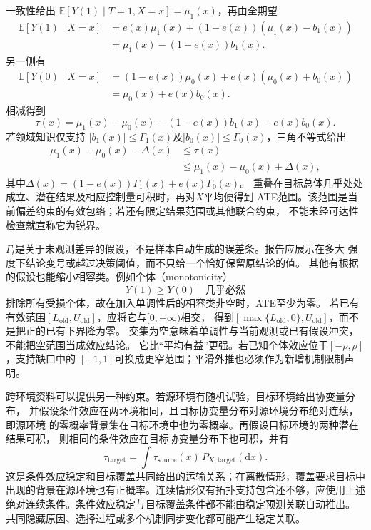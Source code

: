 一致性给出
\(\mathbb E[Y(1)\mid T=1,X=x]=\mu_1(x)\)，再由全期望
\[
  \begin{aligned}
    \mathbb E[Y(1)\mid X=x]
    &=e(x)\mu_1(x)+(1-e(x))(\mu_1(x)-b_1(x))\\
    &=\mu_1(x)-(1-e(x))b_1(x).
  \end{aligned}
\]
另一侧有
\[
  \begin{aligned}
    \mathbb E[Y(0)\mid X=x]
    &=(1-e(x))\mu_0(x)+e(x)(\mu_0(x)+b_0(x))\\
    &=\mu_0(x)+e(x)b_0(x).
  \end{aligned}
\]
相减得到
\begin{equation}
  \tau(x)=\mu_1(x)-\mu_0(x)
  -(1-e(x))b_1(x)-e(x)b_0(x).
  \label{eq:causal-selection-bias-function}
\end{equation}
若领域知识仅支持
\(|b_1(x)|\leq\Gamma_1(x)\)及\(|b_0(x)|\leq\Gamma_0(x)\)，三角不等式给出
\begin{equation}
  \begin{aligned}
    \mu_1(x)-\mu_0(x)-\Delta(x)
    &\leq\tau(x)\\
    &\leq\mu_1(x)-\mu_0(x)+\Delta(x),
  \end{aligned}
  \label{eq:causal-sensitivity-bounds}
\end{equation}
其中\(\Delta(x)=(1-e(x))\Gamma_1(x)+e(x)\Gamma_0(x)\)。
重叠在目标总体几乎处处成立、潜在结果及相应控制量可积时，再对\(X\)平均便得到
ATE范围。该范围是当前偏差约束的有效包络；若还有限定结果范围或其他联合约束，
不能未经可达性检查就宣称它为锐界。

\(\Gamma_t\)是关于未观测差异的假设，不是样本自动生成的误差条。报告应展示在多大
强度下结论变号或越过决策阈值，而不只给一个恰好保留原结论的值。
其他有根据的假设也能缩小相容类。例如个体（monotonicity）
\[
  Y(1)\geq Y(0)\quad\text{几乎必然}
\]
排除所有受损个体，故在加入单调性后的相容类非空时，ATE至少为零。
若已有有效范围\([L_{\mathrm{old}},U_{\mathrm{old}}]\)，应将它与\([0,+\infty)\)相交，
得到\([\max\{L_{\mathrm{old}},0\},U_{\mathrm{old}}]\)，而不是把正的已有下界降为零。
交集为空意味着单调性与当前观测或已有假设冲突，不能把空范围当成效应结论。
它比“平均有益”更强。若已知个体效应位于\([-\rho,\rho]\)，支持缺口中的
\([-1,1]\)可换成更窄范围；平滑外推也必须作为新增机制限制声明。

跨环境资料可以提供另一种约束。若源环境有随机试验，目标环境给出协变量分布，
并假设条件效应在两环境相同，且目标协变量分布对源环境分布绝对连续，即源环境
的零概率背景集在目标环境中也为零概率。再假设目标环境的两种潜在结果可积，
则相同的条件效应在目标协变量分布下也可积，并有
\[
  \tau_{\mathrm{target}}
  =\int\tau_{\mathrm{source}}(x)\,P_{X,\mathrm{target}}(\mathrm dx).
\]
这是条件效应稳定和目标覆盖共同给出的运输关系；在离散情形，覆盖要求目标中
出现的背景在源环境也有正概率。连续情形仅有拓扑支持包含还不够，应使用上述
绝对连续条件。条件效应稳定与目标覆盖条件都不能由稳定预测关联自动推出。
共同隐藏原因、选择过程或多个机制同步变化都可能产生稳定关联。


